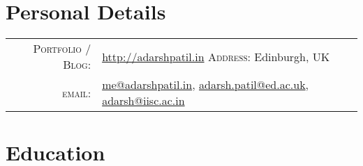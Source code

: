 \documentclass[a4paper,10pt]{article} %
\begin{document}
\pagestyle{empty} %



\par{\bigskip\par} %

\section{Personal Details}

\begin{tabular}{rl}
\textsc{Portfolio / Blog:} & \href{http://adarshpatil.in/timewarp}{http://adarshpatil.in} \hspace{2cm} \textsc{Address:} Edinburgh, UK\\
\textsc{email:} & \href{mailto:me@adarshpatil.in}{me@adarshpatil.in}, \href{mailto:adarsh.patil@ed.ac.uk}{adarsh.patil@ed.ac.uk}, \href{mailto:adarsh@iisc.ac.in}{adarsh@iisc.ac.in}\\
\end{tabular}


\section{Education}
\end{document}
